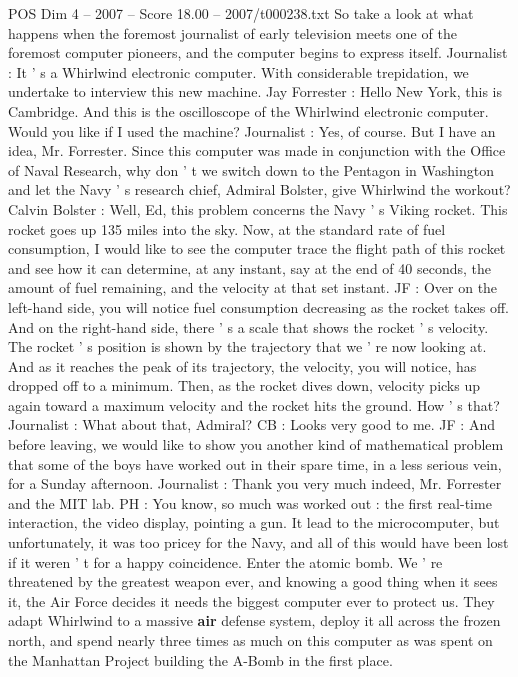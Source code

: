\begin{textsample}{POS Dim 4 – 2007 – Score 18.00 – 2007/t000238.txt}
So take a look at what happens when the foremost journalist of early television meets one of the foremost computer pioneers, and the computer begins to express itself.
Journalist : It ' s a Whirlwind electronic computer.
With considerable trepidation, we undertake to interview this new machine.
Jay Forrester : Hello New York, this is Cambridge.
And this is the oscilloscope of the Whirlwind electronic computer.
Would you like if I used the machine?
Journalist : Yes, of course.
But I have an idea, Mr.
Forrester.
Since this computer was made in conjunction with the Office of Naval Research, why don ' t we switch down to the Pentagon in Washington and let the Navy ' s research chief, Admiral Bolster, give Whirlwind the workout?
Calvin Bolster : Well, Ed, this problem concerns the Navy ' s Viking rocket.
This rocket goes up 135 miles into the sky.
Now, at the standard rate of fuel consumption, I would like to see the computer trace the flight path of this rocket and see how it can determine, at any instant, say at the end of 40 seconds, the amount of fuel remaining, and the velocity at that set instant.
JF : Over on the left-hand side, you will notice fuel consumption decreasing as the rocket takes off.
And on the right-hand side, there ' s a scale that shows the rocket ' s velocity.
The rocket ' s position is shown by the trajectory that we ' re now looking at.
And as it reaches the peak of its trajectory, the velocity, you will notice, has dropped off to a minimum.
Then, as the rocket dives down, velocity picks up again toward a maximum velocity and the rocket hits the ground.
How ' s that?
Journalist : What about that, Admiral?
CB : Looks very good to me.
JF : And before leaving, we would like to show you another kind of mathematical problem that some of the boys have worked out in their spare time, in a less serious vein, for a Sunday afternoon.
Journalist : Thank you very much indeed, Mr.
Forrester and the MIT lab.
PH : You know, so much was worked out : the first real-time interaction, the video display, pointing a gun.
It lead to the microcomputer, but unfortunately, it was too pricey for the Navy, and all of this would have been lost if it weren ' t for a happy coincidence.
Enter the atomic bomb.
We ' re threatened by the greatest weapon ever, and knowing a good thing when it sees it, the Air Force decides it needs the biggest computer ever to protect us.
They adapt Whirlwind to a massive \textbf{air} defense system, deploy it all across the frozen north, and spend nearly three times as much on this computer as was spent on the Manhattan Project building the A-Bomb in the first place.

\end{textsample}
